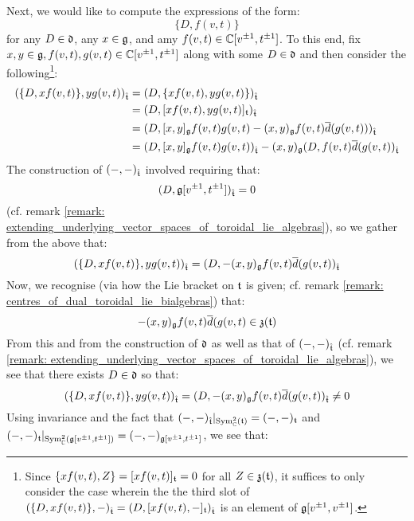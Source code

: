 \begin{remark}
                Next, we would like to compute the expressions of the form:
                    $$\{D,  f(v, t)\}$$
                for any $D \in \mathfrak{d}$, any $x \in \mathfrak{g}$, and amy $f(v, t) \in \mathbb{C}[v^{\pm 1}, t^{\pm 1}]$. To this end, fix $x, y \in \mathfrak{g}, f(v, t), g(v, t) \in \mathbb{C}[v^{\pm 1}, t^{\pm 1}]$ along with some $D \in \mathfrak{d}$ and then consider the following\footnote{Since $\{x f(v, t), Z\} = [x f(v, t)]_{\mathfrak{t}} = 0$ for all $Z \in \mathfrak{z}(\mathfrak{t})$, it suffices to only consider the case wherein the the third slot of $(\{D,  x f(v, t)\}, -)_{\hat{\mathfrak{t}}} = (D, [x f(v, t), -]_{\mathfrak{t}})_{\hat{\mathfrak{t}}}$ is an element of $\mathfrak{g}[v^{\pm 1}, v^{\pm 1}]$.}:
                    $$
                        \begin{aligned}
                            ( \{D, x f(v, t)\}, y g(v, t) )_{\hat{\mathfrak{t}}} & = ( D, \{ x f(v, t), y g(v, t) \} )_{\hat{\mathfrak{t}}}
                            \\
                            & = ( D, [ x f(v, t), y g(v, t) ]_{\mathfrak{t}} )_{\hat{\mathfrak{t}}}
                            \\
                            & = ( D, [x, y]_{\mathfrak{g}} f(v, t) g(v, t) - (x, y)_{\mathfrak{g}} f(v, t) \overline{d}( g(v, t) ) )_{\hat{\mathfrak{t}}}
                            \\
                            & = ( D, [x, y]_{\mathfrak{g}} f(v, t) g(v, t) )_{\hat{\mathfrak{t}}} - (x, y)_{\mathfrak{g}} ( D, f(v, t) \overline{d}( g(v, t) )_{\hat{\mathfrak{t}}}
                        \end{aligned}
                    $$
                The construction of $(-, -)_{\hat{\mathfrak{t}}}$ involved requiring that:
                    $$(D, \mathfrak{g}[v^{\pm 1}, t^{\pm 1}])_{\hat{\mathfrak{t}}} = 0$$
                (cf. remark \ref{remark: extending_underlying_vector_spaces_of_toroidal_lie_algebras}), so we gather from the above that:
                    $$( \{D, x f(v, t)\}, y g(v, t) )_{\hat{\mathfrak{t}}} = ( D, -(x, y)_{\mathfrak{g}} f(v, t) \overline{d}( g(v, t) )_{\hat{\mathfrak{t}}}$$
                Now, we recognise (via how the Lie bracket on $\mathfrak{t}$ is given; cf. remark \ref{remark: centres_of_dual_toroidal_lie_bialgebras}) that:
                    $$-(x, y)_{\mathfrak{g}} f(v, t) \overline{d}( g(v, t) \in \mathfrak{z}(\mathfrak{t})$$
                From this and from the construction of $\mathfrak{d}$ as well as that of $(-, -)_{\hat{\mathfrak{t}}}$ (cf. remark \ref{remark: extending_underlying_vector_spaces_of_toroidal_lie_algebras}), we see that there exists $D \in \mathfrak{d}$ so that:
                    $$( \{D, x f(v, t)\}, y g(v, t) )_{\hat{\mathfrak{t}}} = ( D, -(x, y)_{\mathfrak{g}} f(v, t) \overline{d}( g(v, t) )_{\hat{\mathfrak{t}}} \not = 0$$
                Using invariance and the fact that $(-, -)_{\hat{\mathfrak{t}}}|_{\mathrm{Sym}^2_{\mathbb{C}}(\mathfrak{t})} = (-, -)_{\mathfrak{t}}$ and $(-, -)_{\mathfrak{t}}|_{\mathrm{Sym}^2_{\mathbb{C}}( \mathfrak{g}[v^{\pm 1}, t^{\pm 1}] )} = (-, -)_{ \mathfrak{g}[v^{\pm 1}, t^{\pm 1}] }$, we see that:

\end{remark}
